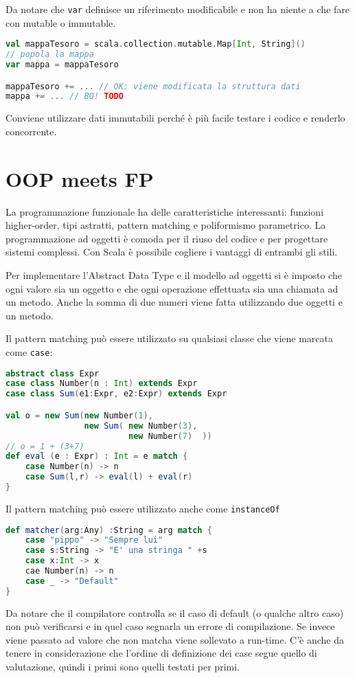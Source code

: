 Da notare che \texttt{var} definisce un riferimento modificabile e non ha niente a che fare con mutable o immutable.

\begin{lstlisting}[language=Scala]
val mappaTesoro = scala.collection.mutable.Map[Int, String]()
// popola la mappa
var mappa = mappaTesoro

mappaTesoro += ... // OK: viene modificata la struttura dati
mappa += ... // BO! TODO
\end{lstlisting}

Conviene utilizzare dati immutabili perché è più facile testare i codice e renderlo concorrente.

\section{OOP meets FP}

La programmazione funzionale ha delle caratteristiche interessanti: funzioni higher-order, tipi astratti, pattern matching e poliformismo parametrico.
La programmazione ad oggetti è comoda per il riuso del codice e per progettare sistemi complessi.
Con Scala è possibile cogliere i vantaggi di entrambi gli stili.

Per implementare l'Abstract Data Type e il modello ad oggetti si è imposto che ogni valore sia un oggetto e che ogni operazione effettuata sia una chiamata ad un metodo. Anche la somma di due numeri viene fatta utilizzando due oggetti e un metodo.

Il pattern matching può essere utilizzato su qualsiasi classe che viene marcata come \texttt{case}:

\begin{lstlisting}[language=Scala]
abstract class Expr
case class Number(n : Int) extends Expr
case class Sum(e1:Expr, e2:Expr) extends Expr

val o = new Sum(new Number(1),
                new Sum( new Number(3),
                         new Number(7)  )) 
// o = 1 + (3+7)
def eval (e : Expr) : Int = e match {
	case Number(n) -> n
	case Sum(l,r) -> eval(l) + eval(r)
}
\end{lstlisting}

Il pattern matching può essere utilizzato anche come \texttt{instanceOf}

\begin{lstlisting}[language=Scala]
def matcher(arg:Any) :String = arg match {
	case "pippo" -> "Sempre lui"
	case s:String -> "E' una stringa " +s
	case x:Int -> x
	cae Number(n) -> n
	case _ -> "Default"
}
\end{lstlisting}

Da notare che il compilatore controlla se il caso di default (o qualche altro caso) non può verificarsi e in quel caso segnarla un errore di compilazione. Se invece viene passato ad valore che non matcha viene sollevato a run-time.
C'è anche da tenere in considerazione che l'ordine di definizione dei case segue quello di valutazione, quindi i primi sono quelli testati per primi.







